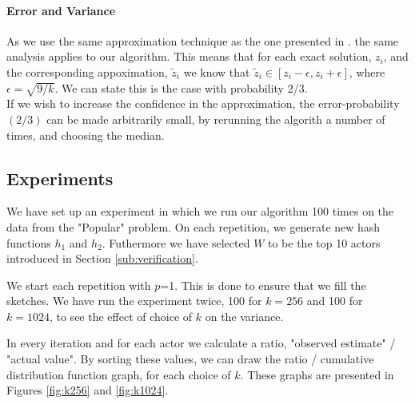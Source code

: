 \documentclass[a4paper,11pt]{article}
\begin{document}
\paragraph{Error and Variance}
As we use the same approximation technique as the one presented in \cite{paper:bar-yos}. the same analysis applies to our algorithm. This means that for each exact solution, $z_i$, and the corresponding appoximation, $\tilde{z}_i$ we know that $\tilde{z}_i \in [z_i-\epsilon,z_i+\epsilon]$, where $\epsilon = \sqrt{9/k}$. We can state this is the case with probability 2/3.\\

If we wish to increase the confidence in the approximation, the error-probability $(2/3)$ can be made arbitrarily small, by rerunning the algorith a number of times, and choosing the median.

\subsection{Experiments}
We have set up an experiment in which we run our algorithm 100 times on the data from the "Popular" problem.
On each repetition, we generate new hash functions $h_1$ and $h_2$.
Futhermore we have selected $W$ to be the top 10 actors introduced in Section \ref{sub:verification}. 

We start each repetition with $p$=1. This is done to ensure that we fill the sketches.
We have run the experiment twice, 100 for $k=256$ and 100 for $k=1024$, to see the effect of choice of $k$ on the variance.

In every iteration and for each actor we calculate a ratio, "observed estimate" / "actual value". By sorting these values, we can draw the ratio / cumulative distribution function graph, for each choice of $k$. These graphs are presented in Figures \ref{fig:k256} and \ref{fig:k1024}.
\end{document}

